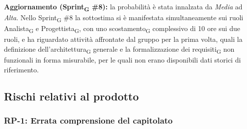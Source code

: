 ﻿\documentclass[a4paper, 10pt, colorlinks=true, linkcolor=black, urlcolor=blue, citecolor=blue, hidelinks]{article}
\begin{document}
\noindent
\textbf{Aggiornamento (Sprint\textsubscript{G} \#8):} la probabilità è stata innalzata da \textit{Media} ad \textit{Alta}. Nello Sprint\textsubscript{G} \#8 la sottostima si è manifestata simultaneamente sui ruoli Analista\textsubscript{G} e Progettista\textsubscript{G}, con uno scostamento\textsubscript{G} complessivo di 10 ore sui due ruoli, e ha riguardato attività affrontate dal gruppo per la prima volta, quali la definizione dell'architettura\textsubscript{G} generale e la formalizzazione dei requisiti\textsubscript{G} non funzionali in forma misurabile, per le quali non erano disponibili dati storici di riferimento.

\subsection{Rischi relativi al prodotto}

\subsubsection{RP-1: Errata comprensione del capitolato}
\end{document}
